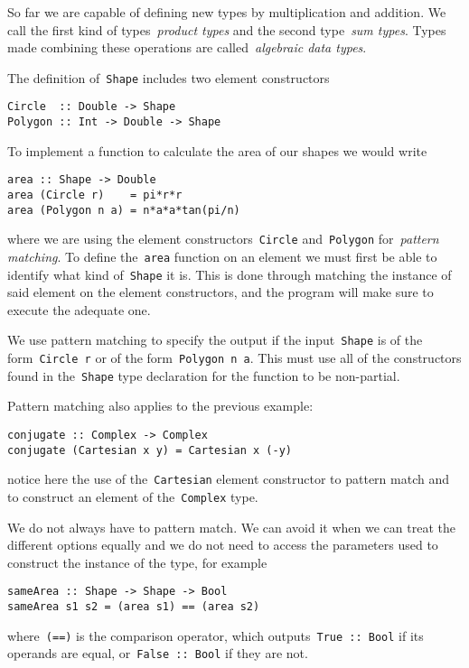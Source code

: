 \documentclass[../TFG.tex]{subfiles}
\begin{document}
So far we are capable of defining new types by multiplication and addition. We
call the first kind of types~\emph{product types} and the second type~\emph{sum
types}. Types made combining these operations are called~\emph{algebraic data
types}.

The definition of~\texttt{Shape} includes two element constructors
\begin{verbatim}
Circle  :: Double -> Shape
Polygon :: Int -> Double -> Shape
\end{verbatim}
To implement a function to calculate the area of our shapes we would write
\begin{verbatim}
area :: Shape -> Double
area (Circle r)    = pi*r*r
area (Polygon n a) = n*a*a*tan(pi/n)
\end{verbatim}
where we are using the element constructors~\texttt{Circle}
and~\texttt{Polygon} for~\emph{pattern matching}. To define
the~\texttt{area} function on an element we must
first be able to identify what kind of~\texttt{Shape} it is. This
is done through matching the instance of said element on the element
constructors, and the program will make sure to execute the adequate one.

We use pattern matching to specify the output if the
input~\texttt{Shape} is of the form~\texttt{Circle r}
or of the form~\texttt{Polygon n a}. This must use all of the
constructors found in the~\texttt{Shape} type declaration for the
function to be non-partial.

Pattern matching also applies to the previous example:
\begin{verbatim}
conjugate :: Complex -> Complex
conjugate (Cartesian x y) = Cartesian x (-y)
\end{verbatim}
notice here the use of the~\texttt{Cartesian} element constructor
to pattern match and to construct an element of
the~\texttt{Complex} type.

We do not always have to pattern match. We can avoid it when we can treat the
different options equally and we do not need to access the parameters used to
construct the instance of the type, for example
\begin{verbatim}
sameArea :: Shape -> Shape -> Bool
sameArea s1 s2 = (area s1) == (area s2)
\end{verbatim}
where~\texttt{(==)} is the comparison operator, which
outputs~\texttt{True :: Bool} if its operands are equal,
or~\texttt{False :: Bool} if they are not.
\end{document}
